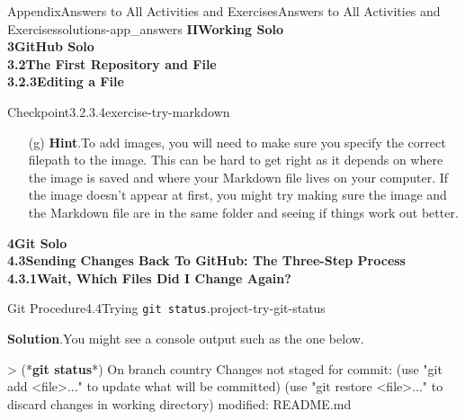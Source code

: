 \documentclass[oneside,10pt,]{book}
\newcommand{\blocktitlefont}{\relax}
\newcommand{\mono}[1]{\texttt{#1}}
\newcommand{\consoleinput}[1]{\textbf{#1}}
\begin{document}
\begin{solutions-chapter}{Appendix}{Answers to All Activities and Exercises}{}{Answers to All Activities and Exercises}{}{}{solutions-app_answers}
\noindent\textbf{\Large{}II\space\textperiodcentered\space{}Working Solo\\
3\space\textperiodcentered\space{}GitHub Solo\\
3.2\space\textperiodcentered\space{}The First Repository and File\\
3.2.3\space\textperiodcentered\space{}Editing a File}
\begin{inlinesolution}{Checkpoint}{3.2.3.4}{}{exercise-try-markdown}%
\begin{enumerate}[font=\bfseries,label=(\alph*),ref=\alph*]%
\item[(g)]\noindent\textbf{\blocktitlefont Hint}.\hypertarget{hint-try-markdown-i-b-back}{}\quad{}To add images, you will need to make sure you specify the correct filepath to the image. This can be hard to get right as it depends on where the image is saved and where your Markdown file lives on your computer. If the image doesn't appear at first, you might try making sure the image and the Markdown file are in the same folder and seeing if things work out better.%
\end{enumerate}%
\end{inlinesolution}%
\par\medskip
\noindent\textbf{\Large{}4\space\textperiodcentered\space{}Git Solo\\
4.3\space\textperiodcentered\space{}Sending Changes Back To GitHub: The Three-Step Process\\
4.3.1\space\textperiodcentered\space{}Wait, Which Files Did I Change Again?}
\begin{projectsolution}{Git Procedure}{4.4}{Trying \mono{git status}.}{project-try-git-status}%
\par\smallskip%
\noindent\textbf{\blocktitlefont Solution}.\hypertarget{solution-try-git-status-e-back}{}\quad{}You might see a console output such as the one below.%
\begin{console}{0}{1}{0}
> (*\consoleinput{git status}*)
On branch country
Changes not staged for commit:
  (use "git add <file>..." to update what will be committed)
  (use "git restore <file>..." to discard changes in working directory)
        modified:   README.md


\end{console}
\end{projectsolution}
\end{solutions-chapter}
\end{document}

